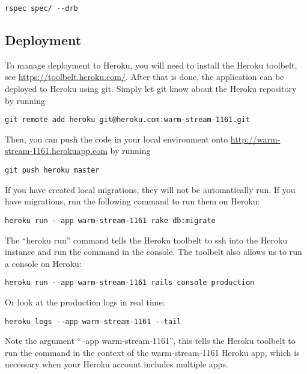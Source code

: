 \documentclass[12pt,letterpaper,titlepage]{article}
\begin{document}
\begin{lstlisting}
rspec spec/ --drb
\end{lstlisting}

\subsection{Deployment} \label{doc:Deployment}

To manage deployment to Heroku, you will need to install the Heroku toolbelt, see \url{https://toolbelt.heroku.com/}. After that is done, the application can be deployed to Heroku using git. Simply let git know about the Heroku repository by running

\begin{lstlisting}
git remote add heroku git@heroku.com:warm-stream-1161.git
\end{lstlisting}

Then, you can push the code in your local environment onto \url{http://warm-stream-1161.herokuapp.com} by running

\begin{lstlisting}
git push heroku master
\end{lstlisting}

If you have created local migrations, they will not be automatically run. If you have migrations, run the following command to run them on Heroku:

\begin{lstlisting}
heroku run --app warm-stream-1161 rake db:migrate
\end{lstlisting}

The ``heroku run'' command tells the Heroku toolbelt to ssh into the Heroku instance and run the command in the console. The toolbelt also allows us to run a console on Heroku:

\begin{lstlisting}
heroku run --app warm-stream-1161 rails console production
\end{lstlisting}

Or look at the production logs in real time:

\begin{lstlisting}
heroku logs --app warm-stream-1161 --tail
\end{lstlisting}

Note the argument ``--app warm-stream-1161'', this tells the Heroku toolbelt to run the command in the context of the warm-stream-1161 Heroku app, which is necessary when your Heroku account includes multiple apps.
\end{document}
